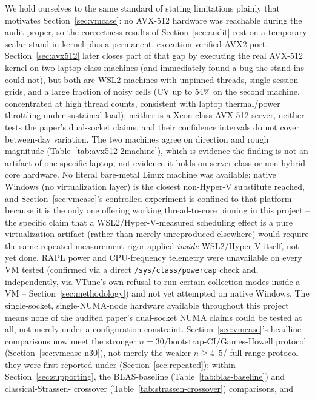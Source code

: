 \documentclass[acmsmall]{acmart}
\begin{document}
We hold ourselves to the same standard of stating limitations plainly
that motivates Section~\ref{sec:vmcase}: no AVX-512 hardware was
reachable during the audit proper, so the correctness results of
Section~\ref{sec:audit} rest on a temporary scalar stand-in kernel plus
a permanent, execution-verified AVX2 port. Section~\ref{sec:avx512}
later closes part of that gap by executing the real AVX-512 kernel on
two laptop-class machines (and immediately found a bug the stand-ins
could not), but both are WSL2 machines with unpinned threads,
single-session grids, and a large fraction of noisy cells (CV up to
54\% on the second machine, concentrated at high thread counts,
consistent with laptop thermal/power throttling under sustained load);
neither is a Xeon-class AVX-512 server, neither tests the paper's
dual-socket claims, and their confidence intervals do not cover
between-day variation. The two machines agree on direction and rough
magnitude (Table~\ref{tab:avx512-2machine}), which is evidence the
finding is not an artifact of one specific laptop, not evidence it holds
on server-class or non-hybrid-core hardware. No literal
bare-metal Linux machine was available; native Windows (no
virtualization layer) is the closest non-Hyper-V substitute reached, and
Section~\ref{sec:vmcase}'s controlled experiment is confined to that
platform because it is the only one offering working thread-to-core
pinning in this project -- the specific claim that a WSL2/Hyper-V-measured
scheduling effect is a pure virtualization artifact (rather than merely
unreproduced elsewhere) would require the same repeated-measurement
rigor applied \emph{inside} WSL2/Hyper-V itself, not yet done. RAPL
power and CPU-frequency telemetry were unavailable on every VM tested
(confirmed via a direct \texttt{/sys/class/powercap} check and,
independently, via VTune's own refusal to run certain collection modes
inside a VM -- Section~\ref{sec:methodology}) and not yet attempted on
native Windows. The single-socket, single-NUMA-node hardware available
throughout this project means none of the audited paper's dual-socket
NUMA claims could be tested at all, not merely under a configuration
constraint. Section~\ref{sec:vmcase}'s headline comparisons now meet
the stronger $n{=}30$/bootstrap-CI/Games-Howell protocol
(Section~\ref{sec:vmcase-n30}), not merely the weaker $n{\geq}4$--$5$/
full-range protocol they were first reported under
(Section~\ref{sec:repeated}); within Section~\ref{sec:supporting}, the
BLAS-baseline (Table~\ref{tab:blas-baseline}) and classical-Strassen-
crossover (Table~\ref{tab:strassen-crossover}) comparisons, and
\end{document}
